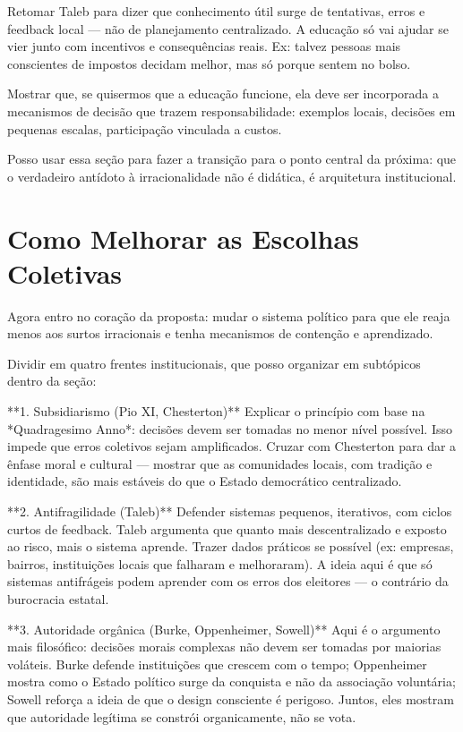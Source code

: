 Retomar Taleb para dizer que conhecimento útil surge de tentativas, erros e feedback local — não de planejamento centralizado. A educação só vai ajudar se vier junto com incentivos e consequências reais. Ex: talvez pessoas mais conscientes de impostos decidam melhor, mas só porque sentem no bolso.

Mostrar que, se quisermos que a educação funcione, ela deve ser incorporada a mecanismos de decisão que trazem responsabilidade: exemplos locais, decisões em pequenas escalas, participação vinculada a custos.

Posso usar essa seção para fazer a transição para o ponto central da próxima: que o verdadeiro antídoto à irracionalidade não é didática, é arquitetura institucional.

\section{Como Melhorar as Escolhas Coletivas} %

Agora entro no coração da proposta: mudar o sistema político para que ele reaja menos aos surtos irracionais e tenha mecanismos de contenção e aprendizado.

Dividir em quatro frentes institucionais, que posso organizar em subtópicos dentro da seção:

**1. Subsidiarismo (Pio XI, Chesterton)**  
Explicar o princípio com base na *Quadragesimo Anno*: decisões devem ser tomadas no menor nível possível. Isso impede que erros coletivos sejam amplificados. Cruzar com Chesterton para dar a ênfase moral e cultural — mostrar que as comunidades locais, com tradição e identidade, são mais estáveis do que o Estado democrático centralizado.

**2. Antifragilidade (Taleb)**  
Defender sistemas pequenos, iterativos, com ciclos curtos de feedback. Taleb argumenta que quanto mais descentralizado e exposto ao risco, mais o sistema aprende. Trazer dados práticos se possível (ex: empresas, bairros, instituições locais que falharam e melhoraram). A ideia aqui é que só sistemas antifrágeis podem aprender com os erros dos eleitores — o contrário da burocracia estatal.

**3. Autoridade orgânica (Burke, Oppenheimer, Sowell)**  
Aqui é o argumento mais filosófico: decisões morais complexas não devem ser tomadas por maiorias voláteis. Burke defende instituições que crescem com o tempo; Oppenheimer mostra como o Estado político surge da conquista e não da associação voluntária; Sowell reforça a ideia de que o design consciente é perigoso. Juntos, eles mostram que autoridade legítima se constrói organicamente, não se vota.

